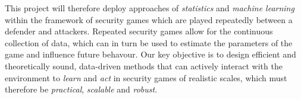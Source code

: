 


This project will therefore deploy approaches of {\em statistics} and {\em machine learning} within the framework of security games which are played repeatedly between a defender and attackers. Repeated security games allow for the continuous collection of data, which can in turn be used to estimate the parameters of the game and influence future behavour. %
Our key objective is to design efficient and theoretically sound, data-driven methods that can actively interact with the environment to {\em learn} and {\em act} in security games of realistic scales, which must therefore be \textit{practical}, \textit{scalable} and \textit{robust}. 


